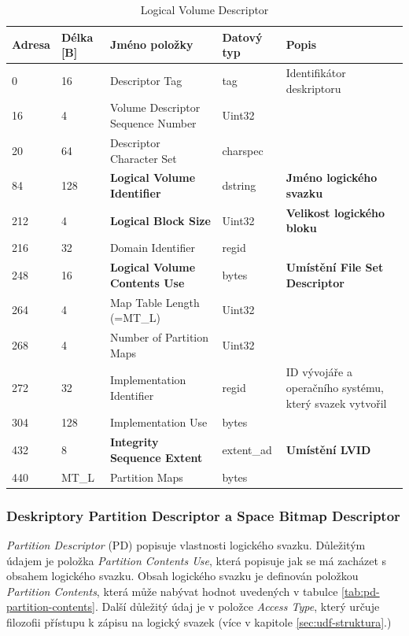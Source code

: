 \begin{table}[]
    \centering
    \begin{tabular}{ | l | l | p{4.2cm} | p{1.8cm} | p{5.5cm} | }
        \hline
        Adresa  & Délka [B]   & Jméno položky & Datový typ    & Popis \\ \hline\hline
        0   &16     & Descriptor Tag                    & tag           & Identifikátor deskriptoru \\ \hline
        16  &4      & Volume Descriptor Sequence Number & Uint32        &  \\ \hline
        20  &64     & Descriptor Character Set          & charspec      &  \\ \hline
        84  &128    & \textbf{Logical Volume Identifier}& dstring       & \textbf{Jméno logického svazku} \\ \hline
        212 &4      &\textbf{Logical Block Size}        & Uint32        & \textbf{Velikost logického bloku} \\ \hline
        216 &32     &Domain Identifier                  & regid         &  \\ \hline
        248 &16     &\textbf{Logical Volume Contents Use}& bytes         & \textbf{Umístění \textbf{File Set Descriptor}}\\ \hline
        264 &4      &Map Table Length (=MT\_L)          & Uint32        & \\ \hline
        268 &4      &Number of Partition Maps           & Uint32        & \\ \hline
        272 &32     &Implementation Identifier          & regid         & ID vývojáře a operačního systému, který svazek vytvořil \\ \hline
        304 &128    &Implementation Use                 & bytes         & \\ \hline
        432 &8      &\textbf{Integrity Sequence Extent} & extent\_ad    & \textbf{Umístění LVID} \\ \hline
        440 &MT\_L  &Partition Maps                     & bytes         & \\ \hline
    \end{tabular}
    \caption{Logical Volume Descriptor\label{tab:lvd}}
\end{table}

\subsubsection{Deskriptory Partition Descriptor a Space Bitmap Descriptor}
\label{subsec:pd-sbd}
\textit{Partition Descriptor} (PD) popisuje vlastnosti logického svazku. Důležitým údajem je položka \textit{Partition Contents Use}, která popisuje jak se má zacházet s obsahem logického svazku. Obsah logického svazku je definován položkou \textit{Partition Contents}, která může nabývat hodnot uvedených v tabulce \ref{tab:pd-partition-contents}. Další důležitý údaj je v položce \textit{Access Type}, který určuje filozofii přístupu k zápisu na logický svazek (více v kapitole \ref{sec:udf-struktura}.)

